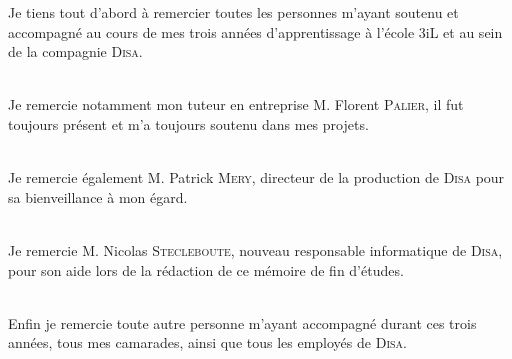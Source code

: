 Je tiens tout d'abord à remercier toutes les personnes m'ayant soutenu et accompagné au cours de mes trois années d'apprentissage à l'école 3iL et au sein de la compagnie \textsc{Disa}.

~\\

Je remercie notamment mon tuteur en entreprise M. Florent \textsc{Palier}, il fut toujours présent et m'a toujours soutenu dans mes projets.

~\\

Je remercie également M. Patrick \textsc{Mery}, directeur de la production de \textsc{Disa} pour sa bienveillance à mon égard.

~\\

Je remercie M. Nicolas \textsc{Stecleboute}, nouveau responsable informatique de \textsc{Disa}, pour son aide lors de la rédaction de ce mémoire de fin d'études.

~\\

Enfin je remercie toute autre personne m'ayant accompagné durant ces trois années, tous mes camarades, ainsi que tous les employés de \textsc{Disa}.
